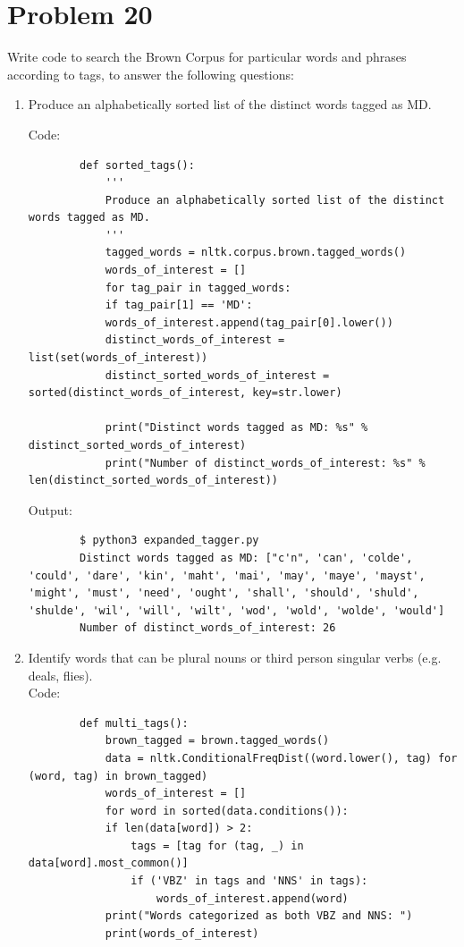 \documentclass[12pt]{article}
\begin{document}
	\section*{Problem 20}
	Write code to search the Brown Corpus for particular words and phrases according to tags, to answer the following questions:
	\begin{enumerate}
		\item Produce an alphabetically sorted list of the distinct words tagged as MD.
		
		Code:\\
		\begin{lstlisting}
		def sorted_tags():
			'''
			Produce an alphabetically sorted list of the distinct words tagged as MD. 
			'''
			tagged_words = nltk.corpus.brown.tagged_words()
			words_of_interest = []
			for tag_pair in tagged_words:
			if tag_pair[1] == 'MD':
			words_of_interest.append(tag_pair[0].lower())
			distinct_words_of_interest = list(set(words_of_interest))
			distinct_sorted_words_of_interest = sorted(distinct_words_of_interest, key=str.lower)
			
			print("Distinct words tagged as MD: %s" % distinct_sorted_words_of_interest)
			print("Number of distinct_words_of_interest: %s" % len(distinct_sorted_words_of_interest))
		\end{lstlisting}
		
		Output:\\
		\begin{lstlisting}
		$ python3 expanded_tagger.py
		Distinct words tagged as MD: ["c'n", 'can', 'colde', 'could', 'dare', 'kin', 'maht', 'mai', 'may', 'maye', 'mayst', 'might', 'must', 'need', 'ought', 'shall', 'should', 'shuld', 'shulde', 'wil', 'will', 'wilt', 'wod', 'wold', 'wolde', 'would']
		Number of distinct_words_of_interest: 26
		\end{lstlisting}
		
		\item Identify words that can be plural nouns or third person singular verbs (e.g. deals, flies).\\
		
		Code:
		\begin{lstlisting}
		def multi_tags():
			brown_tagged = brown.tagged_words()
			data = nltk.ConditionalFreqDist((word.lower(), tag) for (word, tag) in brown_tagged)
			words_of_interest = []
			for word in sorted(data.conditions()):
			if len(data[word]) > 2:
				tags = [tag for (tag, _) in data[word].most_common()]
				if ('VBZ' in tags and 'NNS' in tags):
					words_of_interest.append(word)
			print("Words categorized as both VBZ and NNS: ")
			print(words_of_interest)
		\end{lstlisting}
		

\end{enumerate}
\end{document}
